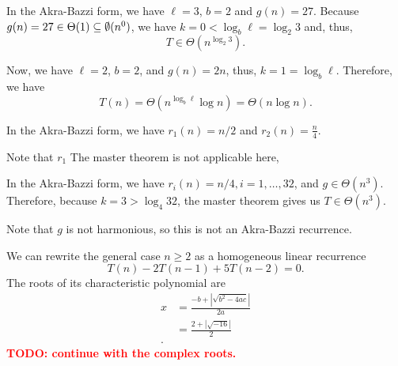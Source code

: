 
In the Akra-Bazzi form, we have $\ell=3$, $b=2$ and $g(n)=27$.
Because $g(n) = 27 \in \Theta(1) \subseteq \emptyset(n^{0})$, we have $k=0 < \log_b \ell = \log_2 3$ and, thus, \[
    T \in \Theta \left( n^{\log_2 3} \right)
.\] 


Now, we have $\ell=2$, $b=2$, and $g(n) = 2n$, thus, $k=1=\log_b \ell$.
Therefore, we have \[
    T(n) = \Theta(n^{\log_b \ell} \log n) = \Theta(n \log n)
.\] 


In the Akra-Bazzi form, we have $r_1(n)=n / 2$ and $r_2(n) = \frac{n}{4}$. 

Note that $r_1$
The master theorem is not applicable here, 


In the Akra-Bazzi form, we have $r_i(n)=n / 4, i=1,\ldots,32$, and $g \in \Theta(n^3)$.
Therefore, because $k=3 > \log_4 32 $, the master theorem gives us $T \in \Theta(n^3)$.


Note that $g$ is not harmonious, so this is not an Akra-Bazzi recurrence.


We can rewrite the general case $n \ge 2$ as a homogeneous linear recurrence \[
    T(n) - 2T(n-1) + 5T(n-2) = 0
.\] The roots of its characteristic polynomial are 
\begin{align*}
    x &= \frac{-b + |\sqrt{b^2 - 4ac} | }{2a} \\
    &= \frac{2 + |\sqrt{-16}|}{2} \\
.\end{align*}
\textcolor{red}{\textbf{TODO: continue with the complex roots.}}

